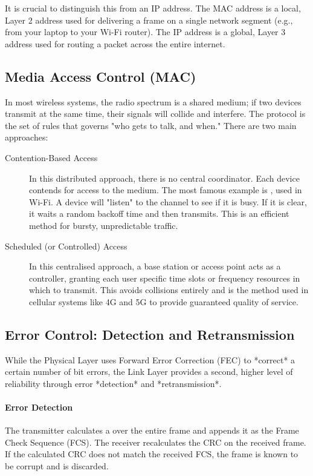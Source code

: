 It is crucial to distinguish this from an IP address. The MAC address is a local, Layer 2 address used for delivering a frame on a single network segment (e.g., from your laptop to your Wi-Fi router). The IP address is a global, Layer 3 address used for routing a packet across the entire internet.

\subsection{Media Access Control (MAC)}

In most wireless systems, the radio spectrum is a shared medium; if two devices transmit at the same time, their signals will collide and interfere. The  protocol is the set of rules that governs "who gets to talk, and when." There are two main approaches:
\begin{description}
    \item[Contention-Based Access] In this distributed approach, there is no central coordinator. Each device contends for access to the medium. The most famous example is , used in Wi-Fi. A device will "listen" to the channel to see if it is busy. If it is clear, it waits a random backoff time and then transmits. This is an efficient method for bursty, unpredictable traffic.
    \item[Scheduled (or Controlled) Access] In this centralised approach, a base station or access point acts as a controller, granting each user specific time slots or frequency resources in which to transmit. This avoids collisions entirely and is the method used in cellular systems like 4G and 5G to provide guaranteed quality of service.
\end{description}

\subsection{Error Control: Detection and Retransmission}

While the Physical Layer uses Forward Error Correction (FEC) to *correct* a certain number of bit errors, the Link Layer provides a second, higher level of reliability through error *detection* and *retransmission*.

\paragraph{Error Detection}
The transmitter calculates a  over the entire frame and appends it as the Frame Check Sequence (FCS). The receiver recalculates the CRC on the received frame. If the calculated CRC does not match the received FCS, the frame is known to be corrupt and is discarded.

